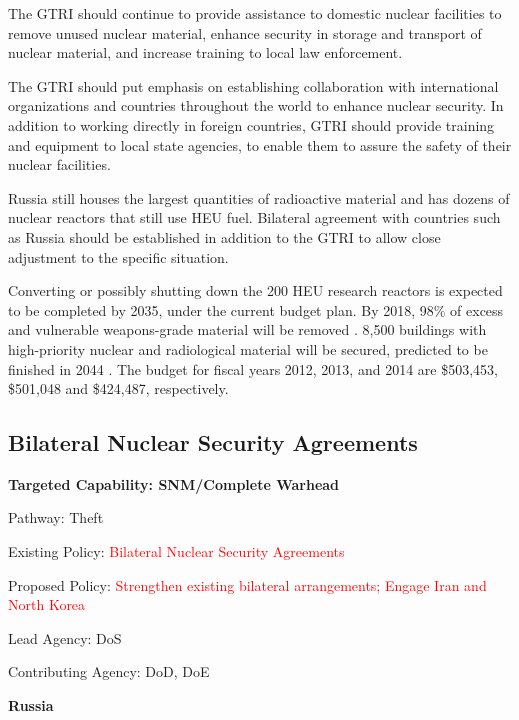 \documentclass{report}
\begin{document}

The GTRI should continue to provide assistance to domestic nuclear facilities to remove unused nuclear material, enhance security in storage and transport of nuclear material, and increase training to local law enforcement. 

The GTRI should put emphasis on establishing collaboration with international organizations and countries throughout the world to enhance nuclear security.  In addition to working directly in foreign countries, GTRI should provide training and equipment to local state agencies, to enable them to assure the safety of their nuclear facilities. 

Russia still houses the largest quantities of radioactive material and has dozens of nuclear reactors that still use HEU fuel.  Bilateral agreement with countries such as Russia should be established in addition to the GTRI to allow close adjustment to the specific situation. 


Converting or possibly shutting down the 200 HEU research reactors is expected to be completed by 2035, under the current budget plan.  By 2018, 98\% of excess and vulnerable weapons-grade material will be removed \cite{Position2014}. 8,500 buildings   with high-priority nuclear and radiological material will be secured, predicted to be finished in 2044 \cite{Roth2014}. The budget for fiscal years 2012, 2013, and 2014 are \$503,453, \$501,048 and \$424,487, respectively. 






\subsection{Bilateral Nuclear Security Agreements}



\bfseries Targeted Capability: SNM/Complete Warhead

Pathway: Theft

Existing Policy:  \textcolor{red}{Bilateral Nuclear Security Agreements}

Proposed Policy:  \textcolor{red}{Strengthen existing bilateral arrangements; Engage Iran and North Korea}

Lead Agency: DoS


Contributing Agency: DoD, DoE  \normalfont



\textbf{Russia}
\end{document}
